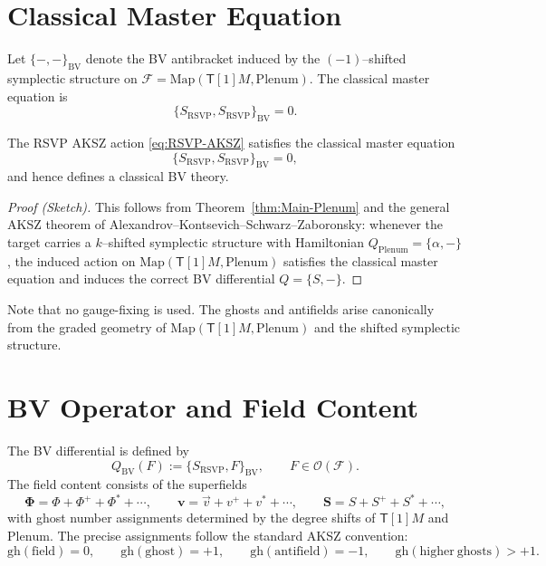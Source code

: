 \section{Classical Master Equation}

Let $\{-,-\}_{\mathrm{BV}}$ denote the BV antibracket induced by the
$(-1)$–shifted symplectic structure on $\mathcal{F}
= \mathrm{Map}(\mathsf{T}[1]M,\mathrm{Plenum})$. The classical master
equation is
\[
\{S_{\mathrm{RSVP}},S_{\mathrm{RSVP}}\}_{\mathrm{BV}} = 0.
\]

\begin{theorem}
\label{thm:CME-RSVP}
The RSVP AKSZ action \eqref{eq:RSVP-AKSZ} satisfies the classical master
equation
\[
\{S_{\mathrm{RSVP}},S_{\mathrm{RSVP}}\}_{\mathrm{BV}} = 0,
\]
and hence defines a classical BV theory.
\end{theorem}

\begin{proof}[Proof (Sketch)]
This follows from Theorem~\ref{thm:Main-Plenum}
and the general AKSZ theorem of
Alexandrov–Kontsevich–Schwarz–Zaboronsky:
whenever the target carries a $k$–shifted symplectic structure with
Hamiltonian $Q_{\mathrm{Plenum}}=\{\alpha,-\}$,
the induced action on
$\mathrm{Map}(\mathsf{T}[1]M,\mathrm{Plenum})$
satisfies the classical master equation and
induces the correct BV differential $Q=\{S,-\}$.
\end{proof}

\begin{remark}
Note that no gauge-fixing is used. The ghosts and antifields arise
canonically from the graded geometry of $\mathrm{Map}(\mathsf{T}[1]M,
\mathrm{Plenum})$ and the shifted symplectic structure.
\end{remark}


\section{BV Operator and Field Content}
\label{sec:BV-operator}

The BV differential is defined by
\[
Q_{\mathrm{BV}}(F) :=
\{ S_{\mathrm{RSVP}}, F\}_{\mathrm{BV}}, \qquad F\in
\mathcal{O}(\mathcal{F}).
\]
The field content consists of the superfields
\[
\mathbf{\Phi} =
\Phi + \Phi^{+} + \Phi^{\ast} + \cdots,
\qquad
\mathbf{v}
= \vec v + v^{+} + v^{\ast} + \cdots,
\qquad
\mathbf{S}
= S + S^{+} + S^{\ast} + \cdots,
\]
with ghost number assignments determined by the degree shifts of
$\mathsf{T}[1]M$ and $\mathrm{Plenum}$. The precise assignments follow
the standard AKSZ convention:
\[
\mathrm{gh}(\mathrm{field})=0,\qquad
\mathrm{gh}(\mathrm{ghost})=+1,\qquad
\mathrm{gh}(\mathrm{antifield})=-1,\qquad
\mathrm{gh}(\mathrm{higher~ghosts})>+1.
\]

